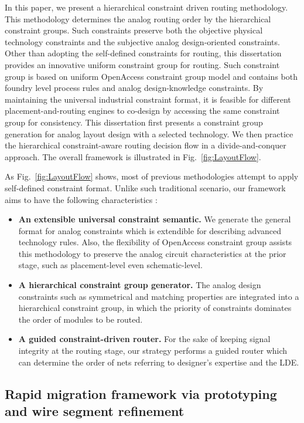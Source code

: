       In this paper, we present a hierarchical constraint driven routing methodology. This methodology determines the analog routing order by the hierarchical constraint groups. Such constraints preserve both the objective physical technology constraints and the subjective  analog design-oriented constraints. Other than adopting the self-defined constraints for routing, this dissertation provides an innovative uniform constraint group for routing. Such constraint group is based on uniform OpenAccess constraint group model and contains both foundry level process rules and analog design-knowledge constraints. By maintaining the universal industrial constraint format, it is feasible for different placement-and-routing engines to co-design by accessing the same constraint group for consistency. This dissertation first presents a constraint group generation for analog layout design with a selected technology. We then practice the hierarchical constraint-aware routing decision flow in a divide-and-conquer approach. The overall framework is illustrated in Fig.~\ref{fig:LayoutFlow}. 
    

      As Fig.~\ref{fig:LayoutFlow} shows, most of previous methodologies attempt to apply self-defined constraint format. Unlike such traditional scenario, our framework aims to have the following characteristics :
      \begin{itemize}
        \item {\bf An extensible universal constraint semantic.} We generate the general format for analog constraints which is extendible for describing advanced technology rules. Also, the flexibility of OpenAccess constraint group assists this methodology to preserve the analog circuit characteristics at the prior stage, such as placement-level even schematic-level.
        \item {\bf A hierarchical constraint group generator.} The analog design constraints such as symmetrical and matching properties are integrated into a hierarchical constraint group, in which the priority of constraints dominates the order of modules to be routed.
        \item {\bf A guided constraint-driven router.} For the sake of keeping signal integrity at the routing stage, our strategy performs a guided router which can determine the order of nets referring to designer's expertise and the LDE.
      \end{itemize}

    \subsection{Rapid migration framework via prototyping and wire segment refinement}

